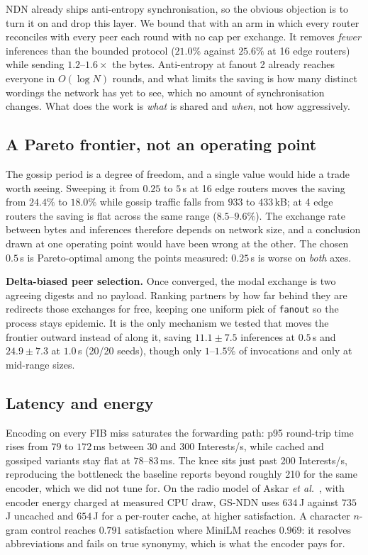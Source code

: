 \documentclass[conference,a4paper]{IEEEtran}
\begin{document}
NDN already ships anti-entropy synchronisation, so the obvious objection is to
turn it on and drop this layer. We bound that with an arm in which every router
reconciles with every peer each round with no cap per exchange. It removes
\emph{fewer} inferences than the bounded protocol ($21.0\%$ against $25.6\%$ at
16 edge routers) while sending $1.2$--$1.6\times$ the bytes. Anti-entropy at
fanout 2 already reaches everyone in $O(\log N)$ rounds, and what limits the
saving is how many distinct wordings the network has yet to see, which no
amount of synchronisation changes. What does the work is \emph{what} is shared
and \emph{when}, not how aggressively.

\subsection{A Pareto frontier, not an operating point}
\label{sec:frontier}

The gossip period is a degree of freedom, and a single value would hide a
trade worth seeing. Sweeping it from $0.25$ to $5$\,s at 16 edge routers moves
the saving from $24.4\%$ to $18.0\%$ while gossip traffic falls from $933$ to
$433$\,kB; at 4 edge routers the saving is flat across the same range
($8.5$--$9.6\%$). The exchange rate between bytes and inferences therefore
depends on network size, and a conclusion drawn at one operating point would
have been wrong at the other. The chosen $0.5$\,s is Pareto-optimal among the
points measured: $0.25$\,s is worse on \emph{both} axes.

\textbf{Delta-biased peer selection.} Once converged, the modal exchange is
two agreeing digests and no payload. Ranking partners by how far behind they
are redirects those exchanges for free, keeping one uniform pick of
\texttt{fanout} so the process stays epidemic. It is the only mechanism we
tested that moves the frontier outward instead of along it, saving
$11.1 \pm 7.5$ inferences at $0.5$\,s and $24.9 \pm 7.3$ at $1.0$\,s (20/20
seeds), though only $1$--$1.5\%$ of invocations and only at mid-range sizes.

\subsection{Latency and energy}
\label{sec:scaling-latency}

Encoding on every FIB miss saturates the forwarding path: p95 round-trip time
rises from $79$ to $172$\,ms between 30 and 300 Interests/s, while cached and
gossiped variants stay flat at $78$--$83$\,ms. The knee sits just past 200
Interests/s, reproducing the bottleneck the baseline reports beyond roughly
210 for the same encoder, which we did not tune for. On the radio model of
Askar \emph{et al.}~\cite{askar2024sef}, with encoder energy charged at
measured CPU draw, GS-NDN uses $634$\,J against $735$\,J uncached and
$654$\,J for a per-router cache, at higher satisfaction. A character
$n$-gram control reaches $0.791$ satisfaction where MiniLM reaches $0.969$:
it resolves abbreviations and fails on true synonymy, which is what the
encoder pays for.
\end{document}

